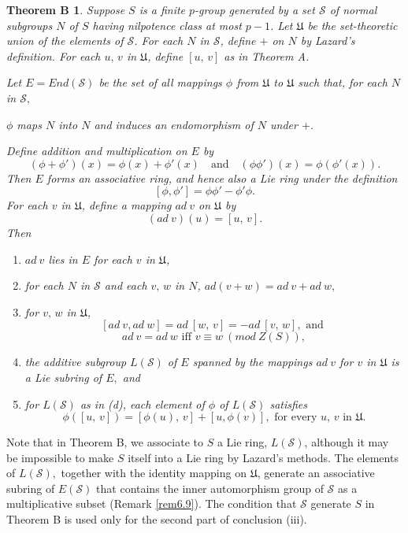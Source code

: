\documentclass[mathscr]{amsart}
\theoremstyle{theorem}
\newtheorem*{theoB}{Theorem B}
\theoremstyle{definition}
\numberwithin{equation}{section}
\def \({\left(}
\def \){\right)}
\def\[{\left[}
\def\]{\right]}
\def\S{\mathcal{S}}
\begin{document}
\begin{theoB}
Suppose $S$ is a finite $p$-group generated by a set $\S$ of normal
subgroups $N$ of $S$ having nilpotence class at most $p-1$. Let
$\mathfrak U$ be the set-theoretic union of the elements of $\S$.
For each $N$ in $\S$, define $+$ on $N$ by Lazard's definition. For
each $u,\,v$ in $\mathfrak U$, define $[u,\,v]$ as in Theorem A.

Let $E=End(\S)$ be the set of all mappings $\phi$ from $\mathfrak U$
to $\mathfrak U$ such that, for each $N$ in $\S,$
\begin{center}
$\phi$ maps $N$ into $N$ and induces an endomorphism of $N$ under
$+$.
\end{center}
Define addition and multiplication on $E$ by
$$\(\phi+\phi'\)(x)=\phi(x)+\phi'(x)\quad\text{and}\quad\(\phi\phi'\)(x)=\phi\(\phi'(x)\).$$
Then $E$ forms an associative ring, and hence also a Lie ring under
the definition $$\left[\phi,\phi'\right]=\phi\phi'-\phi'\phi.$$ For
each $v$ in $\mathfrak U$, define a mapping $ad\ v$ on $\mathfrak U$
by
$$(ad\ v)(u)=[u,\,v].$$
Then
\begin{enumerate}
\item[(i)] $ad\ v$ lies in $E$ for each $v$ in $\mathfrak U$,
\item[(ii)] for each $N$ in $\S$ and each $v,\,w$ in $N$,
$ad(v+w)=ad\ v+ad\ w,$
\item[(iii)] for $v,\,w$ in $\mathfrak U$,
$$[ad\ v, ad\ w]=ad\ [w,\,v]=-ad\ [v,\,w], \text{ and }$$
$$ad\ v=ad\ w\text{ iff } v\equiv w\ (mod\ Z(S)),$$
\item[(iv)] the additive subgroup $L(\S)$ of $E$ spanned by
the mappings $ad\ v$ for $v$ in $\mathfrak U$ is a Lie subring of
$E,$ and
\item[(v)] for $L(\S)$ as in (d), each element of $\phi$ of
$L(\S)$ satisfies
$$\phi\([u,\,v]\)=\[\phi(u),\,v\]+\[u,\phi(v)\], \text{ for every $u,\,v$ in $\mathfrak U.$}$$
\end{enumerate}
\end{theoB}

Note that in Theorem B, we associate to $S$ a Lie ring, $L(\S)$,
although it may be impossible to make $S$ itself into a Lie ring by
Lazard's methods. The elements of $L(\S),$ together with the
identity mapping on $\mathfrak U$, generate an associative subring
of $E(\S)$ that contains the inner automorphism group of $\S$ as a
multiplicative subset (Remark \ref{rem6.9}). The condition that $\S$
generate $S$ in Theorem B is used only for the second part of
conclusion (iii).
\end{document}
